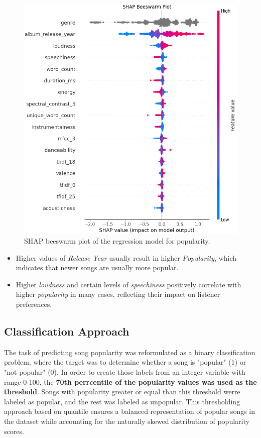 \begin{center}
\begin{figure}[H]
  \centering
  \includegraphics[width=5in]{img/beeswarm_popularity_reg.png}
  \caption{SHAP beeswarm plot of the regression model for popularity.}
  \label{Figure:fig_beh}
\end{figure}
\end{center}

\begin{itemize}
  \item Higher values of \textit{Release Year} usually result in higher
    \textit{Popularity}, which indicates that newer songs are usually more
    popular.
  \item Higher \textit{loudness} and certain levels of \textit{speechiness}
    positively correlate with higher \textit{popularity} in many cases,
    reflecting their impact on listener preferences.
\end{itemize}



\subsection{Classification Approach}

The task of predicting song popularity was reformulated as a binary
classification problem, where the target was to determine whether a song is
"popular" (1) or "not popular" (0). In order to create those labels from an
integer variable with range 0-100, the \textbf{70th perrcentile of the
popularity values was used as the threshold}. Songs with popularity greater or
equal  than this  threshold werre  labeled as popular, and the rest was labeled
as unpopular. This thresholding approach based on quantile ensures a balanced
representation of popular songs in the dataset while accounting for the
naturally skewed distribution of  popularity scores.



